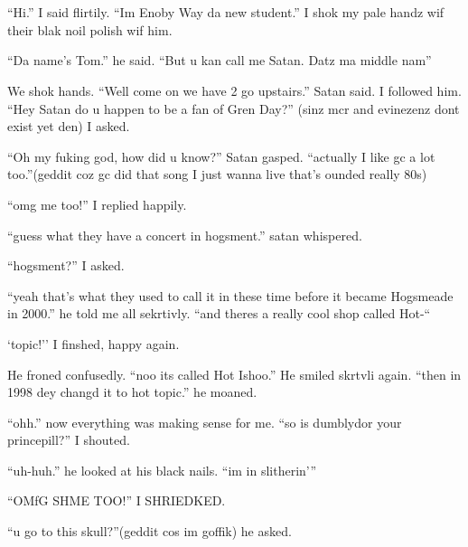 \section{}



\enquote{Hi.} I said flirtily. \enquote{Im Enoby Way da new student.} I shok my pale handz wif their blak noil polish wif him.

\enquote{Da name's Tom.} he said. \enquote{But u kan call me Satan. Datz ma middle nam}

We shok hands. \enquote{Well come on we have 2 go upstairs.} Satan said. I followed him. \enquote{Hey Satan\dotfill\newline
do u happen to be a fan of Gren Day?} (sinz mcr and evinezenz dont exist yet den) I asked.

\enquote{Oh my fuking god, how did u know?} Satan gasped. \enquote{actually I like gc a lot too.}(geddit coz gc did that song I just wanna live that's ounded really 80s)

\enquote{omg me too!} I replied happily.

\enquote{guess what they have a concert in hogsment.} satan whispered.

\enquote{hogsment?} I asked.

\enquote{yeah that's what they used to call it in these time before it became Hogsmeade in 2000.} he told me all sekrtivly. ``and theres a really cool shop called Hot-``

`topic!'' I finshed, happy again.

\begin{sloppypar}
    He froned confusedly. \enquote{noo its called Hot Ishoo.} He smiled skrt\-vli again. \enquote{then in 1998 dey changd it to hot topic.} he moaned.
\end{sloppypar}

\enquote{ohh.} now everything was making sense for me. \enquote{so is dumblydor your princepill?} I shouted.

\enquote{uh-huh.} he looked at his black nails. \enquote{im in slitherin'}

\enquote{OMfG SHME TOO\@!} I SHRIEDKED.

\enquote{u go to this skull?}(geddit cos im goffik) he asked.

